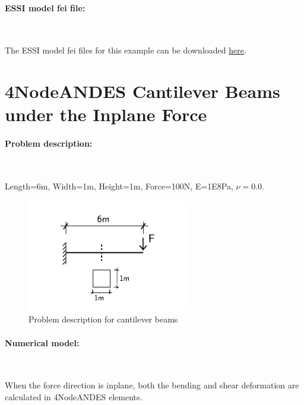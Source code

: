 \documentclass[fleqn,11pt]{article}
\begin{document}
\paragraph{ESSI model fei file: } ~



The ESSI model fei files for this example can be downloaded \href{https://github.com/BorisJeremic/Real-ESSI-Examples/blob/master/model_fei_file/ANDESshell_cantilever_perpendicular_to_plane/ANDESshell_cantilever_perpendicular_to_plane.tgz?raw=true}{here}.








\newpage
\section{4NodeANDES Cantilever Beams under the Inplane Force}

\paragraph{Problem description:} ~

Length=6m, Width=1m, Height=1m, Force=100N, E=1E8Pa, $\nu=0.0$. 

\begin{figure}[H]
  \centering
  \includegraphics[width=7cm]{../Figure-files/cantilever_6.pdf}
  \caption{Problem description for cantilever beams}
  \label{fig Problem description for cantilever 4 2}
\end{figure}

\paragraph{Numerical model:} ~

When the force direction is inplane, both the bending and shear deformation are calculated in 4NodeANDES elements. 
\end{document}
